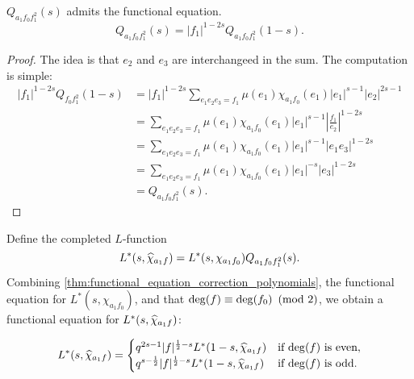 \documentclass[12pt,reqno,oneside]{amsart}
\begin{document}
    \begin{theorem}\label{thm:functional_equation_correction_polynomials}
        $Q_{a_{1}f_{0}f_{1}^{2}}(s)$ admits the functional equation.
        \[
            Q_{a_{1}f_{0}f_{1}^{2}}(s) = |f_{1}|^{1-2s}Q_{a_{1}f_{0}f_{1}^{2}}(1-s).
        \]
    \end{theorem}
    \begin{proof}
        The idea is that $e_{2}$ and $e_{3}$ are interchangeed in the sum. The computation is simple:
        \begin{align*}
            |f_{1}|^{1-2s}Q_{f_{0}f_{1}^{2}}(1-s) &= |f_{1}|^{1-2s}\sum_{e_{1}e_{2}e_{3} = f_{1}}\mu(e_{1})\chi_{a_{1}f_{0}}(e_{1})|e_{1}|^{s-1}|e_{2}|^{2s-1} \\
            &= \sum_{e_{1}e_{2}e_{3} = f_{1}}\mu(e_{1})\chi_{a_{1}f_{0}}(e_{1})|e_{1}|^{s-1}\left|\frac{f_{1}}{e_{2}}\right|^{1-2s} \\
            &= \sum_{e_{1}e_{2}e_{3} = f_{1}}\mu(e_{1})\chi_{a_{1}f_{0}}(e_{1})|e_{1}|^{s-1}|e_{1}e_{3}|^{1-2s} \\
            &= \sum_{e_{1}e_{2}e_{3} = f_{1}}\mu(e_{1})\chi_{a_{1}f_{0}}(e_{1})|e_{1}|^{-s}|e_{3}|^{1-2s} \\
            &= Q_{a_{1}f_{0}f_{1}^{2}}(s).
        \end{align*}
    \end{proof}

    Define the completed $L$-function
    \[
        L^{\ast}(s,\widehat{\chi}_{a_{1}f}) = L^{\ast}(s,\chi_{a_{1}f_{0}})Q_{a_{1}f_{0}f_{1}^{2}}(s).
    \]
    Combining \cref{thm:functional_equation_correction_polynomials}, the functional equation for $L^{\ast}(s,\chi_{a_{1}f_{0}})$, and that $\deg(f) \equiv \deg(f_{0}) \ \left(\text{mod }2\right)$, we obtain a functional equation for $L^{\ast}(s,\widehat{\chi}_{a_{1}f})$:

    \[
        L^{\ast}(s,\widehat{\chi}_{a_{1}f}) = \begin{cases} q^{2s-1}|f|^{\frac{1}{2}-s}L^{\ast}(1-s,\widehat{\chi}_{a_{1}f}) & \text{if $\deg(f)$ is even}, \\ q^{s-\frac{1}{2}}|f|^{\frac{1}{2}-s}L^{\ast}(1-s,\widehat{\chi}_{a_{1}f}) & \text{if $\deg(f)$ is odd}. \end{cases}
    \]
\end{document}
